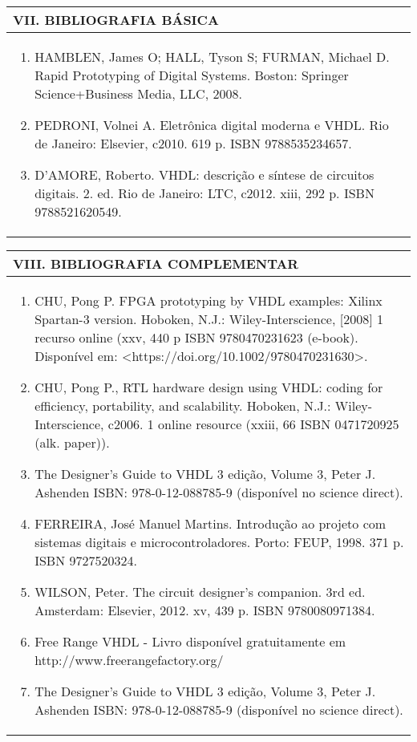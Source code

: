 \documentclass[12pt]{article}
\begin{document}
\begin{longtable}{|L{1.025\textwidth}|} \hline
%
{\bf VII. BIBLIOGRAFIA BÁSICA} \\ \hline

\begin{enumerate}
\item HAMBLEN, James O; HALL, Tyson S; FURMAN, Michael D. Rapid Prototyping of Digital Systems. Boston: Springer Science+Business Media, LLC, 2008. 
\item PEDRONI, Volnei A. Eletrônica digital moderna e VHDL. Rio de Janeiro: Elsevier, c2010. 619 p. ISBN 9788535234657. 
\item D’AMORE, Roberto. VHDL: descrição e síntese de circuitos digitais. 2. ed. Rio de Janeiro: LTC, c2012. xiii, 292 p. ISBN 9788521620549.


\end{enumerate}
 \\ \hline
\end{longtable}



\begin{longtable}{|L{1.025\textwidth}|} \hline
%
{\bf VIII. BIBLIOGRAFIA COMPLEMENTAR} \\ \hline
\begin{enumerate}

\item CHU, Pong P. FPGA prototyping by VHDL examples: Xilinx Spartan-3 version.
Hoboken, N.J.: Wiley-Interscience, [2008] 1 recurso online (xxv, 440 p ISBN 9780470231623 (e-book). Disponível em: <https://doi.org/10.1002/9780470231630>.
\item CHU, Pong P., RTL hardware design using VHDL: coding for efficiency, portability, and scalability. Hoboken, N.J.: Wiley-Interscience, c2006. 1 online resource (xxiii, 66 ISBN 0471720925 (alk. paper)).
\item The Designer’s Guide to VHDL 3 edição, Volume 3, Peter J. Ashenden ISBN: 978-0-12-088785-9 (disponível no science direct).
\item FERREIRA, José Manuel Martins. Introdução ao projeto com sistemas digitais e microcontroladores. Porto: FEUP, 1998. 371 p. ISBN 9727520324.
\item WILSON, Peter. The circuit designer’s companion. 3rd ed. Amsterdam: Elsevier, 2012. xv, 439 p. ISBN 9780080971384.
\item Free Range VHDL - Livro disponível gratuitamente em http://www.freerangefactory.org/ 
\item The Designer's Guide to VHDL 3 edição, Volume 3, Peter J. Ashenden ISBN: 978-0-12-088785-9 (disponível no science direct).
\end{enumerate}
 \\ \hline
\end{longtable}



\end{document}
